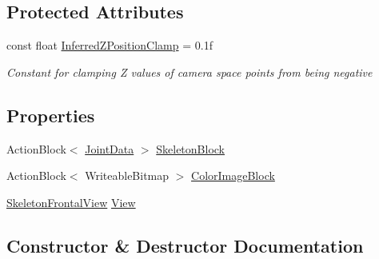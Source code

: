 \subsection*{Protected Attributes}
\begin{DoxyCompactItemize}
\item 
const float \hyperlink{class_rowing_monitor_1_1_model_1_1_pipeline_1_1_skeleton_frontal_display_a4d83794bd1edce81b5162cf7389485a3}{Inferred\+Z\+Position\+Clamp} = 0.\+1f
\begin{DoxyCompactList}\small\item\em Constant for clamping Z values of camera space points from being negative \end{DoxyCompactList}\end{DoxyCompactItemize}
\subsection*{Properties}
\begin{DoxyCompactItemize}
\item 
Action\+Block$<$ \hyperlink{struct_rowing_monitor_1_1_model_1_1_util_1_1_joint_data}{Joint\+Data} $>$ \hyperlink{class_rowing_monitor_1_1_model_1_1_pipeline_1_1_skeleton_frontal_display_ad010abf35902ed0b8bb6ded6a2f6a395}{Skeleton\+Block}
\item 
Action\+Block$<$ Writeable\+Bitmap $>$ \hyperlink{class_rowing_monitor_1_1_model_1_1_pipeline_1_1_skeleton_frontal_display_a1bc8a2facef1ae045fea7c21c637e6ee}{Color\+Image\+Block}
\item 
\hyperlink{class_rowing_monitor_1_1_view_1_1_skeleton_frontal_view}{Skeleton\+Frontal\+View} \hyperlink{class_rowing_monitor_1_1_model_1_1_pipeline_1_1_skeleton_frontal_display_a8be39be7a7348b853f17e4fbd59e8530}{View}
\end{DoxyCompactItemize}


\subsection{Constructor \& Destructor Documentation}
\mbox{\label{class_rowing_monitor_1_1_model_1_1_pipeline_1_1_skeleton_frontal_display_a74506876336e434a4ed20c3e0d7fd86e}} 
